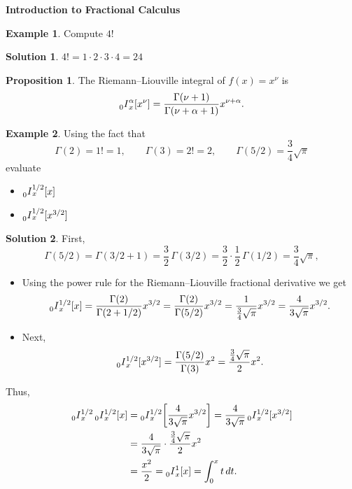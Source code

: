 \documentclass[12pt]{article}
\theoremstyle{definition}
\newtheorem*{proposition*}{Proposition}
\newtheorem*{example*}{Example}
\newtheorem*{solution*}{Solution}
\newcommand{\I}[2]{\prescript{}{#1}{I}_x^{#2}}
\begin{document}

\begin{center}
{\bf {\Large Introduction to Fractional Calculus}}\\[1cm]
\end{center}

\begin{example*}
Compute $4!$
\end{example*}

\begin{solution*}
$4! = 1\cdot 2 \cdot 3 \cdot 4 = 24$
\end{solution*}

\begin{proposition*}
The Riemann--Liouville integral of $f(x) = x^\nu$ is
\[
\I{0}{\alpha}[x^\nu] = \frac{\Gamma(\nu+1)}{\Gamma(\nu+\alpha+1)} x^{\nu+\alpha}.
\]
\end{proposition*}

\begin{example*}
Using the fact that
\[
\Gamma(2) = 1! = 1,\qquad \Gamma(3) = 2! = 2,\qquad \Gamma(5/2) = \frac{3}{4}\sqrt{\pi}
\]
evaluate
\begin{itemize}
\item[(a)] $\I{0}{1/2}[x]$
\item[(b)] $\I{0}{1/2}[x^{3/2}]$
\end{itemize}
\end{example*}

\begin{solution*}
First, 
\[
\Gamma(5/2) = \Gamma(3/2+1) = \frac{3}{2}\, \Gamma(3/2) = \frac{3}{2}\cdot \frac{1}{2}\, \Gamma(1/2) = \frac{3}{4}\sqrt{\pi},
\]
\begin{itemize}
\item[(a)] Using the power rule for the Riemann--Liouville fractional derivative we get
\[
\I{0}{1/2}[x] = \frac{\Gamma(2)}{\Gamma(2+1/2)} x^{3/2} = \frac{\Gamma(2)}{\Gamma(5/2)}x^{3/2} = \frac{1}{\frac{3}{4}\sqrt{\pi}} x^{3/2} = \frac{4}{3\sqrt{\pi}}x^{3/2}.
\]
\item[(b)]Next,
\[
\I{0}{1/2}[x^{3/2}] = \frac{\Gamma(5/2)}{\Gamma(3)} x^2 = \frac{\frac{3}{4}\sqrt{\pi}}{2} x^2.
\]
\end{itemize}
Thus,
\begin{align*}
\I{0}{1/2} \I{0}{1/2}[x] &= \I{0}{1/2}\bigg[\frac{4}{3\sqrt{\pi}}x^{3/2}\bigg]
= \frac{4}{3\sqrt{\pi}} \I{0}{1/2}[x^{3/2}] \\
&= \frac{4}{3\sqrt{\pi}}\cdot \frac{\frac{3}{4}\sqrt{\pi}}{2} x^2 \\
& = \frac{x^2}{2} = \I{0}{1}[x] = \int_0^x t\, dt.
\end{align*}
\end{solution*}
\end{document}

